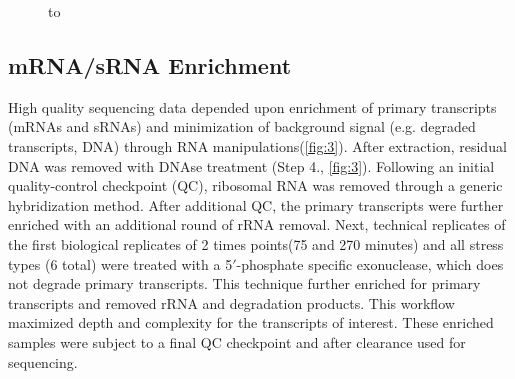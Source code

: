 \begin{figure}
\hbox to 
\end{figure}


\subsection{mRNA/sRNA Enrichment}
High quality sequencing data depended upon enrichment of primary transcripts (mRNAs and sRNAs) and minimization of background signal (e.g. degraded transcripts, DNA) through RNA manipulations(\ref{fig:3}). After extraction, residual DNA was removed with DNAse treatment (Step 4., \ref{fig:3}). Following an initial quality-control checkpoint (QC), ribosomal RNA was removed through a generic hybridization method. After additional QC, the primary transcripts were further enriched with an additional round of rRNA removal. Next, technical replicates of the first biological replicates of 2 times points(75 and 270 minutes) and all stress types (6 total) were treated with a 5$\prime$-phosphate specific exonuclease, which does not degrade primary transcripts. This technique further enriched for primary transcripts and removed rRNA and degradation products. This workflow maximized depth and complexity for the transcripts of interest. These enriched samples were subject to a final QC checkpoint and after clearance used for sequencing.


